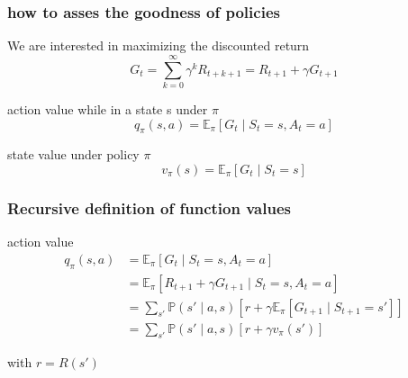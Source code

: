 \documentclass[dvipsnames,svgnames]{beamer}
\begin{document}
\begin{frame}
\frametitle{how to asses the goodness of policies}
\begin{block}{We are interested in maximizing the discounted return}
$$ G_t= \sum_{k=0}^{\infty}\gamma^k R_{t+k+1} = R_{t+1} + \gamma G_{t+1}$$
\end{block}

\pause
\begin{block}{action value while in a state s under $\pi$}
\begin{equation*}
q_{\pi}(s,a) = \mathbb{E}_{\pi}[G_t\mid S_t =s,A_t=a]
\end{equation*}
\end{block}

\pause
\begin{block}{state value under policy $\pi$}
\begin{equation*}
v_{\pi}(s)=\mathbb{E}_{\pi}[G_t \mid S_t=s]
\end{equation*}
\end{block}



\end{frame}

\begin{frame}
\frametitle{Recursive definition of function values}
\begin{block}{action value}
\begin{equation*}
\begin{split}
q_{\pi}(s,a) &= \mathbb{E}_{\pi}[G_t\mid S_t =s, A_t=a]
\\&=\mathbb{E}_{\pi}[R_{t+1}+\gamma G_{t+1}\mid S_t =s, A_t=a]
\\& =\sum_{s'}\mathbb{P}(s'\mid a,s)\left[r + \gamma \mathbb{E}_{\pi}\left[G_{t+1} \mid S_{t+1}=s' \right]\right]
\\& = \sum_{s'}\mathbb{P}(s'\mid a,s)\left[r + \gamma v_{\pi}(s') \right]
\end{split}
\end{equation*}
\end{block}

with $r=R(s')$
\end{frame}
\end{document}
